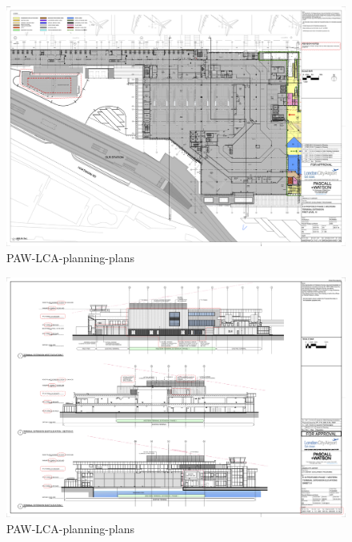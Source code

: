 \documentclass[
]{article}
\begin{document}
\begin{figure}[H]

{\centering \includegraphics{assets/PAW/Proposed-Phase-2-Terminal-Extension-First-Level.png}

}

\caption{PAW-LCA-planning-plans}

\end{figure}%
\begin{figure}[H]

{\centering \includegraphics{assets/PAW/Western-Terminal-Extension-Elevations.png}

}

\caption{PAW-LCA-planning-plans}

\end{figure}%
\end{document}
